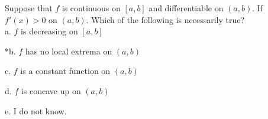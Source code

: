 
Suppose that \( f \) is continuous on \( [ a,b ] \) and differentiable on \( (a,b) \). If \( f'(x) > 0 \) on \( (a,b) \). Which of the following is necessarily true?\\

a. \( f \) is decreasing on \( [ a,b ] \)

*b. \( f \) has no local extrema on \( (a,b) \)

c. \( f \) is a constant function on \( (a,b) \)

d. \( f \) is concave up on \( (a,b) \)

e. I do not know.\\
